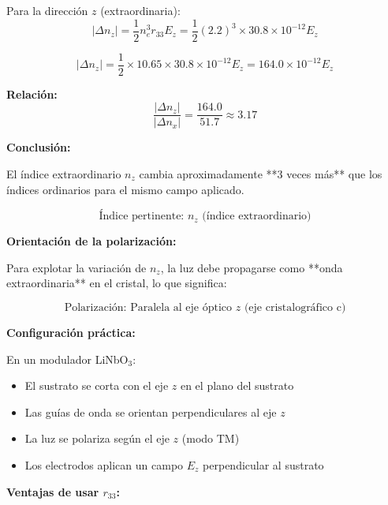 \documentclass[12pt,a4paper]{article}
\begin{document}
Para la dirección $z$ (extraordinaria):
\begin{equation}
    |\Delta n_z| = \frac{1}{2} n_e^3 r_{33} E_z = \frac{1}{2} (2.2)^3 \times 30.8 \times 10^{-12} E_z
\end{equation}

\begin{equation}
    |\Delta n_z| = \frac{1}{2} \times 10.65 \times 30.8 \times 10^{-12} E_z = 164.0 \times 10^{-12} E_z
\end{equation}

\textbf{Relación:}
\begin{equation}
    \frac{|\Delta n_z|}{|\Delta n_x|} = \frac{164.0}{51.7} \approx 3.17
\end{equation}

\textbf{Conclusión:}

El índice extraordinario $n_z$ cambia aproximadamente **3 veces más** que los índices ordinarios para el mismo campo aplicado.

\begin{equation}
    \boxed{\text{Índice pertinente: } n_z \text{ (índice extraordinario)}}
\end{equation}

\textbf{Orientación de la polarización:}

Para explotar la variación de $n_z$, la luz debe propagarse como **onda extraordinaria** en el cristal, lo que significa:

\begin{equation}
    \boxed{\text{Polarización: Paralela al eje óptico } z \text{ (eje cristalográfico c)}}
\end{equation}

\textbf{Configuración práctica:}

En un modulador LiNbO$_3$:
\begin{itemize}
    \item El sustrato se corta con el eje $z$ en el plano del sustrato
    \item Las guías de onda se orientan perpendiculares al eje $z$
    \item La luz se polariza según el eje $z$ (modo TM)
    \item Los electrodos aplican un campo $E_z$ perpendicular al sustrato
\end{itemize}

\textbf{Ventajas de usar $r_{33}$:}
\end{document}
